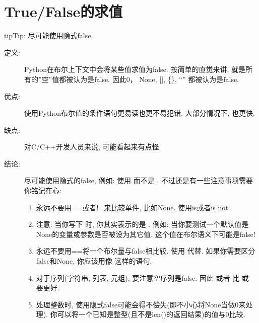 \documentclass[a4paper,10pt,english]{sphinxmanual}
\begin{document}
\section{True/False的求值}
\label{\detokenize{python_language_rules:true-false}}
\begin{sphinxadmonition}{tip}{Tip:}
尽可能使用隐式false
\end{sphinxadmonition}
\begin{description}
\item[{定义:}] \leavevmode
Python在布尔上下文中会将某些值求值为false. 按简单的直觉来讲, 就是所有的”空”值都被认为是false. 因此0， None, {[}{]}, \{\}, “” 都被认为是false.

\item[{优点:}] \leavevmode
使用Python布尔值的条件语句更易读也更不易犯错. 大部分情况下, 也更快.

\item[{缺点:}] \leavevmode
对C/C++开发人员来说, 可能看起来有点怪.

\item[{结论:}] \leavevmode
尽可能使用隐式的false, 例如: 使用  而不是  . 不过还是有一些注意事项需要你铭记在心:
\begin{enumerate}
\item {} 
永远不要用==或者!=来比较单件, 比如None. 使用is或者is not.

\item {} 
注意: 当你写下  时, 你其实表示的是  . 例如: 当你要测试一个默认值是None的变量或参数是否被设为其它值. 这个值在布尔语义下可能是false!

\item {} 
永远不要用==将一个布尔量与false相比较. 使用  代替. 如果你需要区分false和None, 你应该用像  这样的语句.

\item {} 
对于序列(字符串, 列表, 元组), 要注意空序列是false. 因此  或者  比  或  要更好.

\item {} 
处理整数时, 使用隐式false可能会得不偿失(即不小心将None当做0来处理). 你可以将一个已知是整型(且不是len()的返回结果)的值与0比较.
\begin{quote}


\end{quote}
\end{enumerate}
\end{description}
\end{document}
